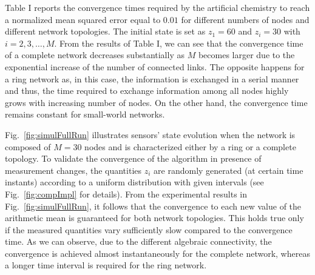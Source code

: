 \documentclass[journal]{IEEEtran}
\begin{document}
{Table I reports the convergence times required by the artificial chemistry to reach a normalized mean squared error equal to $0.01$ for different numbers of nodes and different network topologies. The initial state is set as $z_1 = 60$ {and} $z_i=30$ with $i=2,3,\ldots,M$. } 
{From the results of Table I, we can see that the convergence time of a complete network decreases substantially as $M$ becomes larger {due to the exponential increase of the number of connected links.} The opposite happens for a ring network as, in this case, the information is exchanged in a serial manner and thus, the time required to exchange information among all nodes highly grows with increasing number of nodes.} {On the other hand, the convergence time remains constant for small-world networks.}

Fig.~\ref{fig:simulFullRun} illustrates sensors' state evolution when the network {is composed of} $M=30$ nodes and is characterized either by a ring or a complete topology. To validate the convergence of the algorithm in presence of measurement changes, the quantities $z_i$ {are randomly generated (at certain time instants) according to a uniform distribution} with given intervals (see Fig.~\ref{fig:compImpl} for details). From the experimental results in Fig.~\ref{fig:simulFullRun}, it follows that the convergence to each new value of the arithmetic mean is guaranteed for both network topologies. 
{This holds true only if the measured quantities vary sufficiently slow compared to the convergence time.}
As we can observe, due to the different algebraic connectivity, the convergence is achieved almost instantaneously for the complete network, whereas a longer time interval is required for the ring network. 
\end{document}
